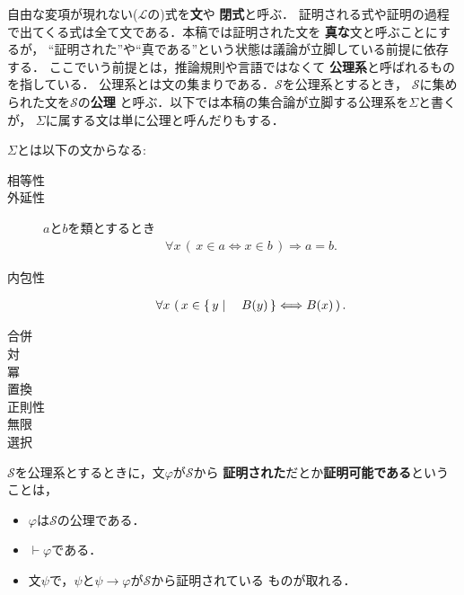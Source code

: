 	自由な変項が現れない($\mathcal{L}$の)式を{\bf 文}や
	{\bf 閉式}と呼ぶ．
	証明される式や証明の過程で出てくる式は全て文である．本稿では証明された文を
	{\bf 真な}文と呼ぶことにするが，
	``証明された''や``真である''という状態は議論が立脚している前提に依存する．
	ここでいう前提とは，推論規則や言語ではなくて
	{\bf 公理系}と呼ばれるものを指している．
	公理系とは文の集まりである．$\mathscr{S}$を公理系とするとき，
	$\mathscr{S}$に集められた文を$\mathscr{S}$の{\bf 公理}
	と呼ぶ．以下では本稿の集合論が立脚する公理系を$\Sigma$と書くが，
	$\Sigma$に属する文は単に公理と呼んだりもする．
	
	$\Sigma$とは以下の文からなる:
	\begin{description}
		\item[相等性]
		\item[外延性] $a$と$b$を類とするとき
			\begin{align}
				\forall x\, (\, x \in a \Longleftrightarrow x \in b\, )
				\Longrightarrow a = b.
			\end{align}
			
		\item[内包性] 
			\begin{align}
				\forall x\, \left(\, x \in \left\{\, y \mid \quad B(y)\, \right\} \Longleftrightarrow B(x)\, \right).
			\end{align}
			
		\item[合併]
		\item[対]
		\item[冪]
		\item[置換]
		\item[正則性]
		\item[無限]
		\item[選択]
	\end{description}
	
	$\mathscr{S}$を公理系とするときに，文$\varphi$が$\mathscr{S}$から
	{\bf 証明された}だとか{\bf 証明可能である}ということは，
	\begin{itemize}
		\item $\varphi$は$\mathscr{S}$の公理である．
		\item $\vdash \varphi$である．
		\item 文$\psi$で，$\psi$と$\psi \rightarrow \varphi$が$\mathscr{S}$から証明されている
			ものが取れる．
	\end{itemize}
	
